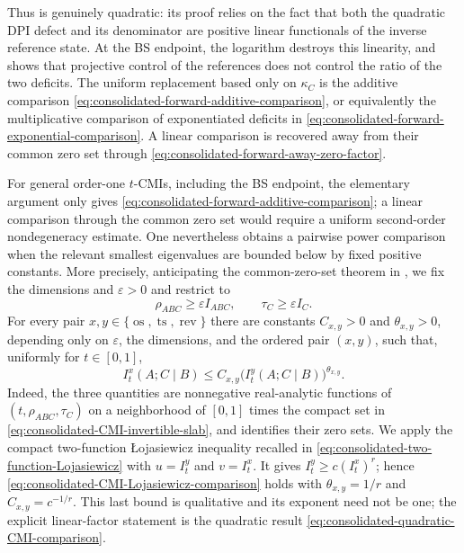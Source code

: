\documentclass[11pt]{article}
\theoremstyle{remark}
\DeclareMathOperator{\os}{os}
\DeclareMathOperator{\ts}{ts}
\DeclareMathOperator{\rev}{rev}
\newcommand{\1}{\mathbbm{1}}
\begin{document}
Thus  is genuinely
quadratic: its proof relies on the fact that both the quadratic DPI
defect and its denominator are positive linear functionals of the
inverse reference state.  At the BS endpoint, the logarithm destroys
this linearity, and
 shows that projective
control of the references does not control the ratio of the two
deficits.  The uniform replacement based only on $\kappa_C$ is the
additive comparison
\eqref{eq:consolidated-forward-additive-comparison}, or equivalently
the multiplicative comparison of exponentiated deficits in
\eqref{eq:consolidated-forward-exponential-comparison}.  A linear
comparison is recovered away from their common zero set through
\eqref{eq:consolidated-forward-away-zero-factor}.

For general order-one $t$-CMIs, including the BS endpoint, the
elementary argument only gives
\eqref{eq:consolidated-forward-additive-comparison}; a linear
comparison through the common zero set would require a uniform
second-order nondegeneracy estimate.  One nevertheless obtains a
pairwise power comparison when the relevant smallest eigenvalues are
bounded below by fixed positive constants.  More
precisely, anticipating the common-zero-set theorem in
, we fix the dimensions and
$\varepsilon>0$ and restrict to
\begin{equation}
 \rho_{ABC}\geq\varepsilon I_{ABC},\qquad
 \tau_C\geq\varepsilon I_C.
 \label{eq:consolidated-CMI-invertible-slab}
\end{equation}
For every pair $x,y\in\{\os,\ts,\rev\}$ there are constants
$C_{x,y}>0$ and $\theta_{x,y}>0$, depending only on $\varepsilon$,
the dimensions, and the ordered pair $(x,y)$, such that, uniformly
for $t\in[0,1]$,
\begin{equation}
 I_t^x(A;C\mid B)
 \leq C_{x,y}\bigl(I_t^y(A;C\mid B)\bigr)^{\theta_{x,y}}.
 \label{eq:consolidated-CMI-Lojasiewicz-comparison}
\end{equation}
Indeed, the three quantities are nonnegative real-analytic functions
of $(t,\rho_{ABC},\tau_C)$ on a neighborhood of $[0,1]$ times the
compact set in \eqref{eq:consolidated-CMI-invertible-slab}, and
 identifies their zero sets.
We apply the compact two-function \L{}ojasiewicz inequality recalled in
\eqref{eq:consolidated-two-function-Lojasiewicz} with
$u=I_t^y$ and $v=I_t^x$.  It gives $I_t^y\geq c(I_t^x)^r$;
hence \eqref{eq:consolidated-CMI-Lojasiewicz-comparison} holds with
$\theta_{x,y}=1/r$ and $C_{x,y}=c^{-1/r}$.  This last bound
is qualitative and its exponent need not be one; the explicit
linear-factor statement is the quadratic result
\eqref{eq:consolidated-quadratic-CMI-comparison}.
\end{document}
